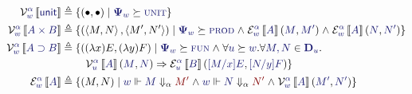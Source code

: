\documentclass[11pt]{amsart}
\theoremstyle{definition}
\theoremstyle{remark}
\numberwithin{equation}{section}
\def\InputModeColorName{MidnightBlue}
\def\OutputModeColorName{Maroon}
\newcommand\IMode[1]{{\color{\InputModeColorName}{#1}}}
\newcommand\OMode[1]{{\color{\OutputModeColorName}{#1}}}
\newcommand\Sem[1]{\left\llbracket \IMode{#1}\right\rrbracket}
\newcommand\Force[2]{\IMode{#1}\Vdash #2}
\newcommand\Val[3]{\mathcal{V}_{\IMode{#1}}^{\IMode{#2}}\Sem{#3}}
\newcommand\IsVal[5]{\Val{#1}{#2}{#3}\left(\IMode{#4},\IMode{#5}\right)}
\newcommand\Exp[3]{\mathcal{E}_{\IMode{#1}}^{\IMode{#2}}\Sem{#3}}
\newcommand\IsExp[5]{\Exp{#1}{#2}{#3}\left(\IMode{#4},\IMode{#5}\right)}
\newcommand\SetLit[1]{\left\{#1\right\}}
\newcommand\CompLit[2]{\SetLit{#1\mid #2}}
\newcommand\Sig[1]{\mathbf{\Psi}_{#1}}
\newcommand\SigUnit{\textsc{unit}}
\newcommand\TyUnit{\mathsf{unit}}
\newcommand\SuccEq[2]{\IMode{#1}\succeq\IMode{#2}}
\newcommand\SigProd{\textsc{prod}}
\newcommand\TyProd[2]{#1\times #2}
\newcommand\Pair[2]{\left\langle #1, #2 \right\rangle}
\newcommand\SigFun{\textsc{fun}}
\newcommand\TyFun[2]{#1\supset #2}
\newcommand\Lam[2]{(\lambda #1)#2}
\newcommand\Member[2]{\IMode{#1} \in \IMode{#2}}
\newcommand\Eval[3]{\IMode{#2}\Downarrow_{#1}\OMode{#3}}
\newcommand\Dom[1]{\mathbf{D}_{#1}}
\begin{document}
\begin{align*}
  \Val{w}{\alpha}{\TyUnit}
    &\triangleq
    \CompLit{(\bullet, \bullet)}{
      \SuccEq{\Sig{w}}{\SigUnit}
    }\\
  \Val{w}{\alpha}{\TyProd{A}{B}}
    &\triangleq
    \CompLit{
      (\Pair{M}{N} , \Pair{M'}{N'})
    }{
      \SuccEq{\Sig{w}}{\SigProd}
      \mathrel\land
      \IsExp{w}{\alpha}{A}{M}{M'}
      \mathrel\land
      \IsExp{w}{\alpha}{A}{N}{N'}
    }\\
  \Val{w}{\alpha}{\TyFun{A}{B}}
    &\triangleq
    \{
      (\Lam{x}{E}, \Lam{y}{F})
    \mid
      \SuccEq{\Sig{w}}{\SigFun}
      \mathrel\land
      \forall\SuccEq{u}{w}.
      \forall\Member{M,N}{\Dom{u}}.\\
      & \phantom{xxxx}\IsVal{u}{\alpha}{A}{M}{N} \Rightarrow
        \IsExp{u}{\alpha}{B}{[M/x]E}{[N/y]F}
    \}\\
  \Exp{w}{\alpha}{A}
    &\triangleq
    \CompLit{
      (M,N)
    }{
      \Force{w}{\Eval{\alpha}{M}{M'}}
      \mathrel\land
      \Force{w}{\Eval{\alpha}{N}{N'}}
      \mathrel\land
      \IsVal{w}{\alpha}{A}{M'}{N'}
    }
\end{align*}

\bigskip
\end{document}
